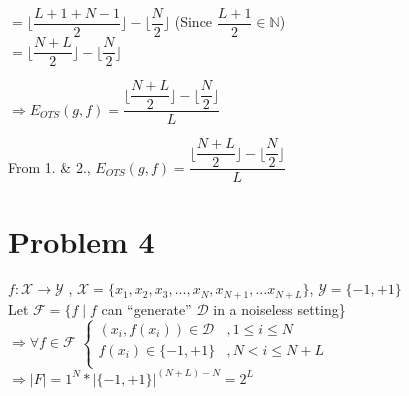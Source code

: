 \documentclass[12pt, a4paper]{article}
\begin{document}
\begin{CJK}{UTF8}{bkai}
\begin{enumerate}
\begin{enumerate}
					$ = \lfloor \dfrac{L+1+N-1}{2}\rfloor - \lfloor \dfrac{N}{2}\rfloor$  \hspace{3.2em}
					(Since $\dfrac{L+1}{2} \in \mathbb{N}$) \\
					$ = \lfloor \dfrac{N+L}{2}\rfloor - \lfloor \dfrac{N}{2}\rfloor$
				\end{enumerate}
				$\Rightarrow E_{OTS}(g,f) = \dfrac{ \lfloor \dfrac{N+L}{2}\rfloor - \lfloor \dfrac{N}{2}\rfloor }{L}$
		\end{enumerate}
		From 1. \& 2., $E_{OTS}(g,f) = \dfrac{ \lfloor \dfrac{N+L}{2}\rfloor - \lfloor \dfrac{N}{2}\rfloor }{L}$

	\newpage
	\section*{Problem 4}
		$f: \mathcal{X}\rightarrow \mathcal{Y}$ , $\mathcal{X} = \{x_1,x_2,x_3,...,x_N,x_{N+1},...x_{N+L}\}$, $\mathcal{Y} = \{-1, +1\}$ \\
		Let $\mathcal{F} = \{f \mid f$ can “generate” $\mathcal{D}$ in a noiseless setting\}  \\
		$\Rightarrow \forall f \in \mathcal{F}$ 
		$\begin{cases}
			(x_i, f(x_i)) \in \mathcal{D} & ,1\leq i\leq N \\
			f(x_i) \in \{-1, +1\}& ,N < i \leq N+L \\
		\end{cases}$ \\
		$\Rightarrow |F| = 1^N * |\{-1,+1\}|^ {(N+L)-N} = 2^L$



\end{CJK}
\end{document}
